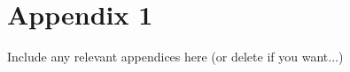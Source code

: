 \newpage
\appendix
\section{Appendix 1}
Include any relevant appendices here (or delete if you want...)